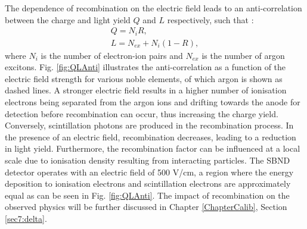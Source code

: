 
The dependence of recombination on the electric field leads to an anti-correlation between the charge and light yield $Q$ and $L$ respectively, such that \cite{argoneut_recomb}:
\begin{gather}
        \label{eq:Q}
        Q = N_{i}R, \\ 
        \label{eq:L}
        L = N_{ex} + N_{i}(1 - R),
\end{gather}
where $N_{i}$ is the number of electron-ion pairs and $N_{ex}$ is the number of argon excitons.
Fig. \ref{fig:QLAnti} illustrates the anti-correlation as a function of the electric field strength for various noble elements, of which argon is shown as dashed lines.
A stronger electric field results in a higher number of ionisation electrons being separated from the argon ions and drifting towards the anode for detection before recombination can occur, thus increasing the charge yield. 
Conversely, scintillation photons are produced in the recombination process.
In the presence of an electric field, recombination decreases, leading to a reduction in light yield.
Furthermore, the recombination factor can be influenced at a local scale due to ionisation density resulting from interacting particles.
The SBND detector operates with an electric field of 500 V/cm, a region where the energy deposition to ionisation electrons and scintillation electrons are approximately equal as can be seen in Fig.
 \ref{fig:QLAnti}.
The impact of recombination on the observed physics will be further discussed in Chapter \ref{ChapterCalib}, Section \ref{sec7:delta}.

